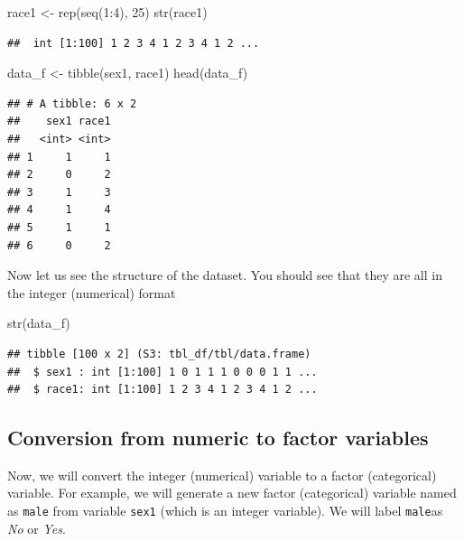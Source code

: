 \documentclass[
]{book}
\makeatletter
\newenvironment{Shaded}{\begin{snugshade}}{\end{snugshade}}
\newcommand{\DecValTok}[1]{\textcolor[rgb]{0.06,0.06,0.06}{#1}}
\newcommand{\FunctionTok}[1]{\textcolor[rgb]{0,0,0}{#1}}
\newcommand{\NormalTok}[1]{#1}
\newcommand{\OtherTok}[1]{\textcolor[rgb]{0.37,0.37,0.37}{#1}}
\newcommand{\SpecialCharTok}[1]{\textcolor[rgb]{0,0,0}{#1}}
\newenvironment{kframe}{%
\medskip{}
\setlength{\fboxsep}{.8em}
 \def\at@end@of@kframe{}%
 \ifinner\ifhmode%
  \def\at@end@of@kframe{\end{minipage}}%
  \begin{minipage}{\columnwidth}%
 \fi\fi%
 \def\FrameCommand##1{\hskip\@totalleftmargin \hskip-\fboxsep
 \colorbox{shadecolor}{##1}\hskip-\fboxsep
     \hskip-\linewidth \hskip-\@totalleftmargin \hskip\columnwidth}%
 \MakeFramed {\advance\hsize-\width
   \@totalleftmargin\z@ \linewidth\hsize
   \@setminipage}}%
 {\par\unskip\endMakeFramed%
 \at@end@of@kframe}
\renewenvironment{Shaded}{\begin{kframe}}{\end{kframe}}
\makeatother
\begin{document}
\begin{Shaded}
\begin{Highlighting}[]
\NormalTok{race1 }\OtherTok{\textless{}{-}} \FunctionTok{rep}\NormalTok{(}\FunctionTok{seq}\NormalTok{(}\DecValTok{1}\SpecialCharTok{:}\DecValTok{4}\NormalTok{), }\DecValTok{25}\NormalTok{)}
\FunctionTok{str}\NormalTok{(race1)}
\end{Highlighting}
\end{Shaded}

\begin{verbatim}
##  int [1:100] 1 2 3 4 1 2 3 4 1 2 ...
\end{verbatim}

\begin{Shaded}
\begin{Highlighting}[]
\NormalTok{data\_f }\OtherTok{\textless{}{-}} \FunctionTok{tibble}\NormalTok{(sex1, race1)}
\FunctionTok{head}\NormalTok{(data\_f)}
\end{Highlighting}
\end{Shaded}

\begin{verbatim}
## # A tibble: 6 x 2
##    sex1 race1
##   <int> <int>
## 1     1     1
## 2     0     2
## 3     1     3
## 4     1     4
## 5     1     1
## 6     0     2
\end{verbatim}

Now let us see the structure of the dataset. You should see that they are all in the integer (numerical) format

\begin{Shaded}
\begin{Highlighting}[]
\FunctionTok{str}\NormalTok{(data\_f)}
\end{Highlighting}
\end{Shaded}

\begin{verbatim}
## tibble [100 x 2] (S3: tbl_df/tbl/data.frame)
##  $ sex1 : int [1:100] 1 0 1 1 1 0 0 0 1 1 ...
##  $ race1: int [1:100] 1 2 3 4 1 2 3 4 1 2 ...
\end{verbatim}

\hypertarget{conversion-from-numeric-to-factor-variables}{%
\subsection{Conversion from numeric to factor variables}\label{conversion-from-numeric-to-factor-variables}}

Now, we will convert the integer (numerical) variable to a factor (categorical) variable. For example, we will generate a new factor (categorical) variable named as \texttt{male} from variable \texttt{sex1} (which is an integer variable). We will label \texttt{male}as \emph{No} or \emph{Yes}.
\end{document}
